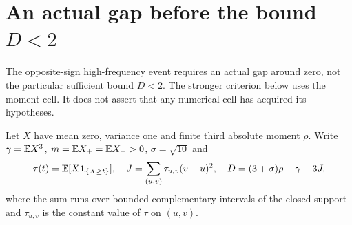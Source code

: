 \section{An actual gap before the bound \texorpdfstring{$D<2$}{D<2}}
\label{v6gap:section}

The opposite-sign high-frequency event requires an actual gap around
zero, not the particular sufficient bound $D<2$. The stronger criterion
below uses the moment cell. It does not assert that any numerical cell
has acquired its hypotheses.

Let $X$ have mean zero, variance one and finite third absolute moment
$\rho$. Write $\gamma=\mathbb E X^3$, $m=\mathbb E X_+=\mathbb E X_->0$,
$\sigma=\sqrt{10}$ and
\[
 \tau(t)=\mathbb E[X\mathbf1_{\{X\ge t\}}],\quad
 J=\sum_{(u,v)}\tau_{u,v}(v-u)^2,\quad
 D=(3+\sigma)\rho-\gamma-3J,
\]
where the sum runs over bounded complementary intervals of the closed
support and $\tau_{u,v}$ is the constant value of $\tau$ on $(u,v)$.

